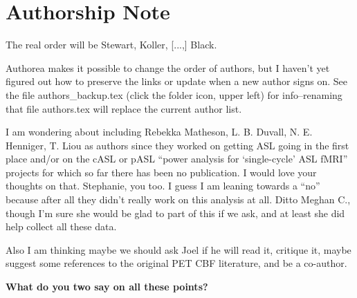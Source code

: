 \section*{Authorship Note}
The real order will be Stewart, Koller, [...,] Black.

Authorea makes it possible to change the order of authors, but I haven't yet figured out how to preserve the links or update when a new author signs on. See the file authors\_backup.tex (click the folder icon, upper left) for info--renaming that file authors.tex will replace the current author list.

I am wondering about including Rebekka Matheson, L. B. Duvall, N. E. Henniger, T. Liou as authors since they worked on getting ASL going in the first place and/or on the cASL or pASL ``power analysis for `single-cycle' ASL fMRI'' projects for which so far there has been no publication. I would love your thoughts on that. Stephanie, you too. I guess I am leaning towards a ``no'' because after all they didn't really work on this analysis at all. Ditto Meghan C., though I'm sure she would be glad to part of this if we ask, and at least she did help collect all these data. 

Also I am thinking maybe we should ask Joel if he will read it, critique it, maybe suggest some references to the original PET CBF literature, and be a co-author. 

\textbf{What do you two say on all these points?}